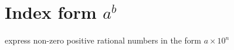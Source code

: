 

\label{chap:index}



\section{Index form $a^b$}

express non-zero positive rational
numbers in the form
$a\times 10^n$

